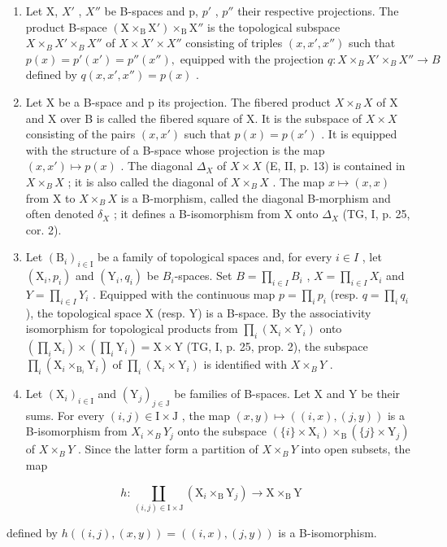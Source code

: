\begin{enumerate}
\def\labelenumi{\arabic{enumi})}
\setcounter{enumi}{1}
\item
  Let X, \(X'\) , \(X''\) be B-spaces and p, \(p'\) , \(p''\) their respective projections. The product B-space \((\mathrm{X} \times_{\mathrm{B}} \mathrm{X}') \times_{\mathrm{B}} \mathrm{X}''\) is the topological subspace \(X \times_{B} X' \times_{B} X''\) of \(X \times X' \times X''\) consisting of triples \((x, x', x'')\) such that \(p(x) = p'(x') = p''(x''), \text{ equipped with the projection } q: X \times_{B} X' \times_{B} X'' \to B\) defined by \(q(x, x', x'') = p(x)\) .
\item
  Let X be a B-space and p its projection. The fibered product \(X \times_{B} X\) of X and X over B is called the fibered square of X. It is the subspace of \(X \times X\) consisting of the pairs \((x, x')\) such that \(p(x) = p(x')\) . It is equipped with the structure of a B-space whose projection is the map \((x, x') \mapsto p(x)\) . The diagonal \(\Delta_{X}\) of \(X \times X\) (E, II, p. 13) is contained in \(X \times_{B} X\) ; it is also called the diagonal of \(X \times_{B} X\) . The map \(x \mapsto (x, x)\) from X to \(X \times_{B} X\) is a B-morphism, called the diagonal B-morphism and often denoted \(\delta_{X}\) ; it defines a B-isomorphism from X onto \(\Delta_{X}\) (TG, I, p. 25, cor. 2).
\item
  Let \((\mathrm{B}_{i})_{i\in\mathrm{I}}\) be a family of topological spaces and, for every \(i\in I\) , let \((\mathrm{X}_{i},p_{i})\) and \((\mathrm{Y}_{i},q_{i})\) be \(B_{i}\)-spaces. Set \(B=\prod_{i\in I}B_{i}\) , \(X=\prod_{i\in I}X_{i}\) and \(Y=\prod_{i\in I}Y_{i}\) . Equipped with the continuous map \(p=\prod_{i}p_{i}\) (resp. \(q=\prod_{i}q_{i}\) ), the topological space X (resp. Y) is a B-space. By the associativity isomorphism for topological products from \(\prod_{i}(\mathrm{X}_{i}\times\mathrm{Y}_{i})\) onto \((\prod_{i}\mathrm{X}_{i})\times(\prod_{i}\mathrm{Y}_{i})=\mathrm{X}\times\mathrm{Y}\) (TG, I, p. 25, prop. 2), the subspace \(\prod_{i}(\mathrm{X}_{i}\times_{\mathrm{B}_{i}}\mathrm{Y}_{i})\) of \(\prod_{i}(\mathrm{X}_{i}\times\mathrm{Y}_{i})\) is identified with \(X\times_{B}Y\) .
\item
  Let \((\mathrm{X}_{i})_{i\in\mathrm{I}}\) and \((\mathrm{Y}_{j})_{j\in\mathrm{J}}\) be families of B-spaces. Let X and Y be their sums. For every \((i,j)\in\mathrm{I}\times\mathrm{J}\) , the map \((x,y)\mapsto((i,x),(j,y))\) is a B-isomorphism from \(X_{i}\times_{B}Y_{j}\) onto the subspace \((\{i\}\times\mathrm{X}_{i})\times_{\mathrm{B}}(\{j\}\times\mathrm{Y}_{j})\) of \(X\times_{B}Y\) . Since the latter form a partition of \(X\times_{B}Y\) into open subsets, the map
\end{enumerate}

\[
h \colon \coprod_ {(i, j) \in \mathrm{I} \times \mathrm{J}} (\mathrm{X} _ {i} \times_ {\mathrm{B}} \mathrm{Y} _ {j}) \to \mathrm{X} \times_ {\mathrm{B}} \mathrm{Y}
\]

defined by \(h((i,j),(x,y)) = ((i,x),(j,y))\) is a B-isomorphism.


